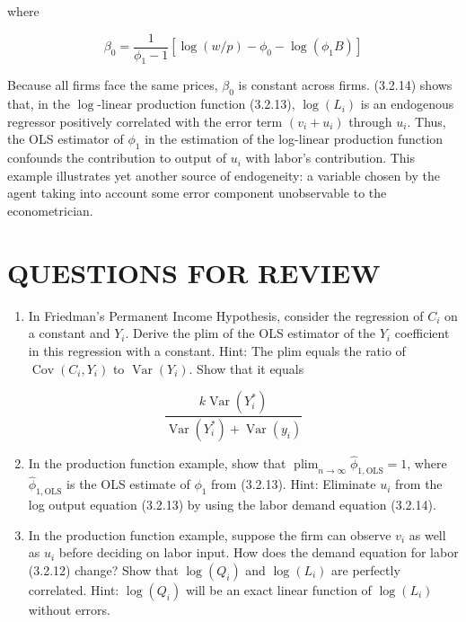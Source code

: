\documentclass[10pt]{article}
\begin{document}
where

$$
\beta_{0}=\frac{1}{\phi_{1}-1}\left[\log (w / p)-\phi_{0}-\log \left(\phi_{1} B\right)\right]
$$

Because all firms face the same prices, $\beta_{0}$ is constant across firms. (3.2.14) shows that, in the $\log$-linear production function (3.2.13), $\log \left(L_{i}\right)$ is an endogenous regressor positively correlated with the error term $\left(v_{i}+u_{i}\right)$ through $u_{i}$. Thus, the OLS estimator of $\phi_{1}$ in the estimation of the log-linear production function confounds the contribution to output of $u_{i}$ with labor's contribution. This example illustrates yet another source of endogeneity: a variable chosen by the agent taking into account some error component unobservable to the econometrician.

\section*{QUESTIONS FOR REVIEW}
\begin{enumerate}
  \item In Friedman's Permanent Income Hypothesis, consider the regression of $C_{i}$ on a constant and $Y_{i}$. Derive the plim of the OLS estimator of the $Y_{i}$ coefficient in this regression with a constant. Hint: The plim equals the ratio of $\operatorname{Cov}\left(C_{i}, Y_{i}\right)$ to $\operatorname{Var}\left(Y_{i}\right)$. Show that it equals
\end{enumerate}

$$
\frac{k \operatorname{Var}\left(Y_{i}^{*}\right)}{\operatorname{Var}\left(Y_{i}^{*}\right)+\operatorname{Var}\left(y_{i}\right)}
$$

\begin{enumerate}
  \setcounter{enumi}{1}
  \item In the production function example, show that $\operatorname{plim}_{n \rightarrow \infty} \hat{\phi}_{1, \mathrm{OLS}}=1$, where $\hat{\phi}_{1, \mathrm{OLS}}$ is the OLS estimate of $\phi_{1}$ from (3.2.13). Hint: Eliminate $u_{i}$ from the log output equation (3.2.13) by using the labor demand equation (3.2.14).
  \item In the production function example, suppose the firm can observe $v_{i}$ as well as $u_{i}$ before deciding on labor input. How does the demand equation for labor\\
(3.2.12) change? Show that $\log \left(Q_{i}\right)$ and $\log \left(L_{i}\right)$ are perfectly correlated. Hint: $\log \left(Q_{i}\right)$ will be an exact linear function of $\log \left(L_{i}\right)$ without errors.
\end{enumerate}
\end{document}
